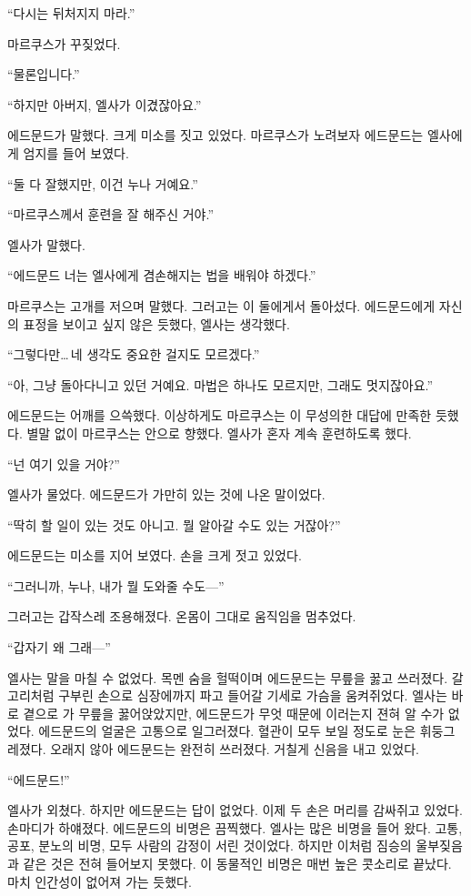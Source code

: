 ``다시는 뒤처지지 마라.''

마르쿠스가 꾸짖었다.

``물론입니다.''

``하지만 아버지, 엘사가 이겼잖아요.''

에드문드가 말했다. 크게 미소를 짓고 있었다. 마르쿠스가 노려보자 에드문드는 엘사에게 엄지를 들어 보였다.

``둘 다 잘했지만, 이건 누나 거예요.''

``마르쿠스께서 훈련을 잘 해주신 거야.''

엘사가 말했다.

``에드문드 너는 엘사에게 겸손해지는 법을 배워야 하겠다.''

마르쿠스는 고개를 저으며 말했다. 그러고는 이 둘에게서 돌아섰다. 에드문드에게 자신의 표정을 보이고 싶지 않은 듯했다, 엘사는 생각했다.

``그렇다만\ldots\,네 생각도 중요한 걸지도 모르겠다.''

``아, 그냥 돌아다니고 있던 거예요. 마법은 하나도 모르지만, 그래도 멋지잖아요.''

에드문드는 어깨를 으쓱했다. 이상하게도 마르쿠스는 이 무성의한 대답에 만족한 듯했다. 별말 없이 마르쿠스는 안으로 향했다. 엘사가 혼자 계속 훈련하도록 했다.

``넌 여기 있을 거야?''

엘사가 물었다. 에드문드가 가만히 있는 것에 나온 말이었다.

``딱히 할 일이 있는 것도 아니고. 뭘 알아갈 수도 있는 거잖아?''

에드문드는 미소를 지어 보였다. 손을 크게 젓고 있었다.

``그러니까, 누나, 내가 뭘 도와줄 수도—''

그러고는 갑작스레 조용해졌다. 온몸이 그대로 움직임을 멈추었다.

``갑자기 왜 그래—''

엘사는 말을 마칠 수 없었다. 목멘 숨을 헐떡이며 에드문드는 무릎을 꿇고 쓰러졌다. 갈고리처럼 구부린 손으로 심장에까지 파고 들어갈 기세로 가슴을 움켜쥐었다. 엘사는 바로 곁으로 가 무릎을 꿇어앉았지만, 에드문드가 무엇 때문에 이러는지 젼혀 알 수가 없었다. 에드문드의 얼굴은 고통으로 일그러졌다. 혈관이 모두 보일 정도로 눈은 휘둥그레졌다. 오래지 않아 에드문드는 완전히 쓰러졌다. 거칠게 신음을 내고 있었다.

``에드문드!''

엘사가 외쳤다. 하지만 에드문드는 답이 없었다. 이제 두 손은 머리를 감싸쥐고 있었다. 손마디가 하얘졌다. 에드문드의 비명은 끔찍했다. 엘사는 많은 비명을 들어 왔다. 고통, 공포, 분노의 비명, 모두 사람의 감정이 서린 것이었다. 하지만 이처럼 짐승의 울부짖음과 같은 것은 전혀 들어보지 못했다. 이 동물적인 비명은 매번 높은 콧소리로 끝났다. 마치 인간성이 없어져 가는 듯했다.

